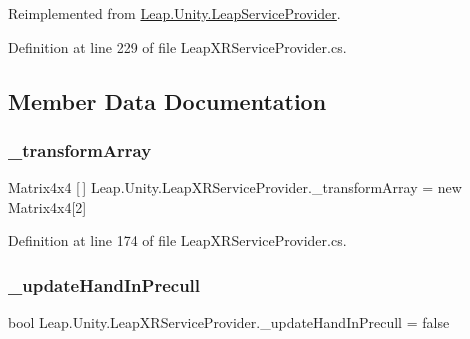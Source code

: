 Reimplemented from \mbox{\hyperlink{class_leap_1_1_unity_1_1_leap_service_provider_a8823a3e4e7c2c5f1d71dbe9a9fb937f4}{Leap.\+Unity.\+Leap\+Service\+Provider}}.



Definition at line 229 of file Leap\+X\+R\+Service\+Provider.\+cs.



\subsection{Member Data Documentation}
\mbox{\label{class_leap_1_1_unity_1_1_leap_x_r_service_provider_a5b9871acb331833b7f15215adb0d3015}} 
\subsubsection{\texorpdfstring{\_transformArray}{\_transformArray}}
{\footnotesize\ttfamily Matrix4x4 \mbox{[}$\,$\mbox{]} Leap.\+Unity.\+Leap\+X\+R\+Service\+Provider.\+\_\+transform\+Array = new Matrix4x4\mbox{[}2\mbox{]}\hspace{0.3cm}{\ttfamily [protected]}}



Definition at line 174 of file Leap\+X\+R\+Service\+Provider.\+cs.

\mbox{\label{class_leap_1_1_unity_1_1_leap_x_r_service_provider_a5467eed05493c0cf4cc732568596f6eb}} 
\subsubsection{\texorpdfstring{\_updateHandInPrecull}{\_updateHandInPrecull}}
{\footnotesize\ttfamily bool Leap.\+Unity.\+Leap\+X\+R\+Service\+Provider.\+\_\+update\+Hand\+In\+Precull = false\hspace{0.3cm}{\ttfamily [protected]}}




